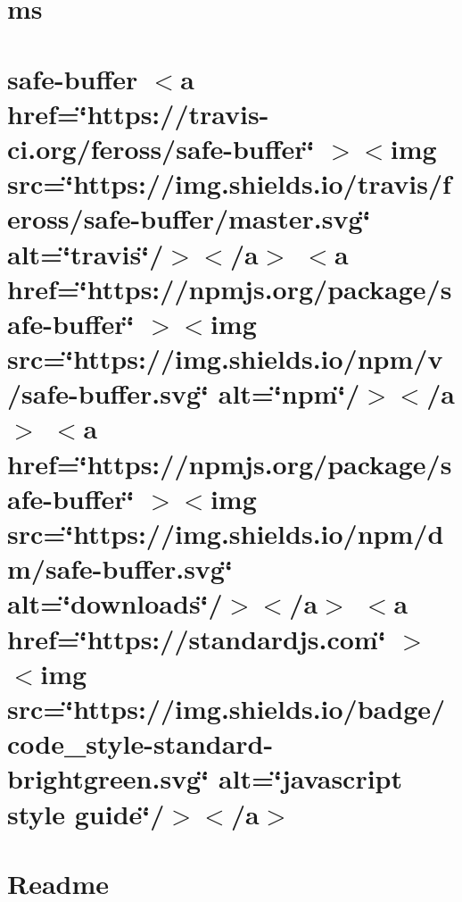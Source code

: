 \documentclass[twoside]{book}
\newcommand{\+}{\discretionary{\mbox{\scriptsize$\hookleftarrow$}}{}{}}
\begin{document}
\chapter{ms}
\label{md__c___users_vaishnavi_jadhav__desktop__developer_code_mean_stack_example_client_node_modules_express_node_modules_ms_readme}

\chapter{safe-\/buffer \texorpdfstring{$<$}{<}a href=\char`\"{}https\+://travis-\/ci.\+org/feross/safe-\/buffer\char`\"{} \texorpdfstring{$>$}{>}\texorpdfstring{$<$}{<}img src=\char`\"{}https\+://img.\+shields.\+io/travis/feross/safe-\/buffer/master.\+svg\char`\"{} alt=\char`\"{}travis\char`\"{}/\texorpdfstring{$>$}{>}\texorpdfstring{$<$}{<}/a\texorpdfstring{$>$}{>} \texorpdfstring{$<$}{<}a href=\char`\"{}https\+://npmjs.\+org/package/safe-\/buffer\char`\"{} \texorpdfstring{$>$}{>}\texorpdfstring{$<$}{<}img src=\char`\"{}https\+://img.\+shields.\+io/npm/v/safe-\/buffer.\+svg\char`\"{} alt=\char`\"{}npm\char`\"{}/\texorpdfstring{$>$}{>}\texorpdfstring{$<$}{<}/a\texorpdfstring{$>$}{>} \texorpdfstring{$<$}{<}a href=\char`\"{}https\+://npmjs.\+org/package/safe-\/buffer\char`\"{} \texorpdfstring{$>$}{>}\texorpdfstring{$<$}{<}img src=\char`\"{}https\+://img.\+shields.\+io/npm/dm/safe-\/buffer.\+svg\char`\"{} alt=\char`\"{}downloads\char`\"{}/\texorpdfstring{$>$}{>}\texorpdfstring{$<$}{<}/a\texorpdfstring{$>$}{>} \texorpdfstring{$<$}{<}a href=\char`\"{}https\+://standardjs.\+com\char`\"{} \texorpdfstring{$>$}{>}\texorpdfstring{$<$}{<}img src=\char`\"{}https\+://img.\+shields.\+io/badge/code\+\_\+style-\/standard-\/brightgreen.\+svg\char`\"{} alt=\char`\"{}javascript style guide\char`\"{}/\texorpdfstring{$>$}{>}\texorpdfstring{$<$}{<}/a\texorpdfstring{$>$}{>}}
\label{md__c___users_vaishnavi_jadhav__desktop__developer_code_mean_stack_example_client_node_modules_ed1ba26fd9c26180a6d6e3aa29e05dbf0}

\chapter{Readme}
\label{md__c___users_vaishnavi_jadhav__desktop__developer_code_mean_stack_example_client_node_modules_express__readme}

\end{document}
